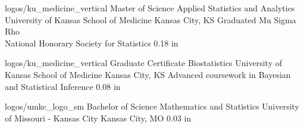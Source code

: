 
\EducationExtraNoDate
{logos/ku_medicine_vertical}
{Master of Science}
{Applied Statistics and Analytics}
{University of Kansas School of Medicine}
{Kansas City, KS}
{Graduated Mu Sigma Rho\\ National Honorary Society for Statistics}
{0.18 in}

\vspace*{0.01 in}

\EducationExtraNoDate
{logos/ku_medicine_vertical}
{Graduate Certificate}
{Biostatistics}
{University of Kansas School of Medicine}
{Kansas City, KS}
{Advanced coursework in Bayesian and Statistical Inference}
{0.08 in}


\vspace*{0.01 in}

\EducationNoDate
{logos/umkc_logo_sm}
{Bachelor of Science}
{Mathematics and Statistics}
{University of Missouri - Kansas City}
{Kansas City, MO}
{0.03 in}